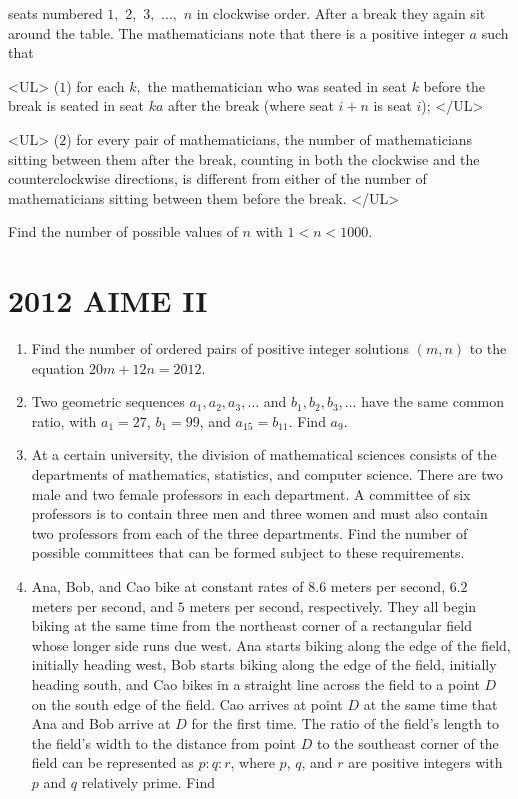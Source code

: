 \documentclass{article}
\begin{document}
\begin{enumerate}[label=\arabic*., itemsep=0.5em]
seats numbered $1,$ $2,$ $3,$ $...,$ $n$ in clockwise order. After a break they again sit around the table. The mathematicians note that there is a positive integer $a$ such that

<UL>
($1$) for each $k,$ the mathematician who was seated in seat $k$ before the break is seated in seat $ka$ after the break (where seat $i + n$ is seat $i$);
</UL>

<UL>
($2$) for every pair of mathematicians, the number of mathematicians sitting between them after the break, counting in both the clockwise and the counterclockwise directions, is different from either of the number of mathematicians sitting between them before the break.
</UL>

Find the number of possible values of $n$ with $1 < n < 1000.$\par \vspace{0.5em}\end{enumerate}\newpage\section*{2012 AIME II}\begin{enumerate}[label=\arabic*., itemsep=0.5em]\item Find the number of ordered pairs of positive integer solutions $(m, n)$ to the equation $20m + 12n = 2012$.\par \vspace{0.5em}\item Two geometric sequences $a_1, a_2, a_3, \ldots$ and $b_1, b_2, b_3, \ldots$ have the same common ratio, with $a_1 = 27$, $b_1=99$, and $a_{15}=b_{11}$. Find $a_9$.\par \vspace{0.5em}\item At a certain university, the division of mathematical sciences consists of the departments of mathematics, statistics, and computer science. There are two male and two female professors in each department. A committee of six professors is to contain three men and three women and must also contain two professors from each of the three departments. Find the number of possible committees that can be formed subject to these requirements.\par \vspace{0.5em}\item Ana, Bob, and Cao bike at constant rates of $8.6$ meters per second, $6.2$ meters per second, and $5$ meters per second, respectively. They all begin biking at the same time from the northeast corner of a rectangular field whose longer side runs due west. Ana starts biking along the edge of the field, initially heading west, Bob starts biking along the edge of the field, initially heading south, and Cao bikes in a straight line across the field to a point $D$ on the south edge of the field. Cao arrives at point $D$ at the same time that Ana and Bob arrive at $D$ for the first time. The ratio of the field's length to the field's width to the distance from point $D$ to the southeast corner of the field can be represented as $p : q : r$, where $p$, $q$, and $r$ are positive integers with $p$ and $q$ relatively prime. Find 
\end{enumerate}
\end{document}
